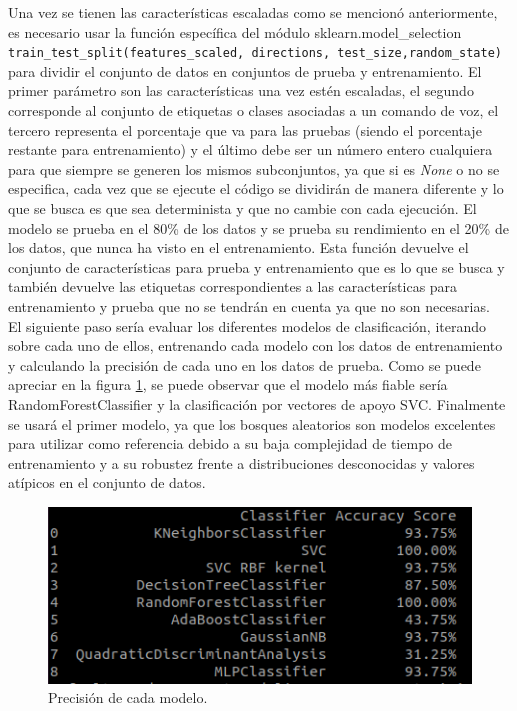 Una vez se tienen las características escaladas como se mencionó anteriormente, es necesario usar la función específica del módulo sklearn.model\_selection \verb|train_test_split(features_scaled, directions, test_size,random_state)| para dividir el conjunto de datos en conjuntos de prueba y entrenamiento. El primer parámetro son las características una vez estén escaladas, el segundo corresponde al conjunto de etiquetas o clases asociadas a un comando de voz, el tercero representa el porcentaje que va para las pruebas (siendo el porcentaje restante para entrenamiento) y el último debe ser un número entero cualquiera para que siempre se generen los mismos subconjuntos, ya que si es \textit{None} o no se especifica, cada vez que se ejecute el código se dividirán de manera diferente y lo que se busca es que sea determinista y que no cambie con cada ejecución. El modelo se prueba en el 80\% de los datos y se prueba su rendimiento en el 20\% de los datos, que nunca ha visto en el entrenamiento. Esta función devuelve el conjunto de características para prueba y entrenamiento que es lo que se busca y también devuelve las etiquetas correspondientes a las características para entrenamiento y prueba que no se tendrán en cuenta ya que no son necesarias.\\

El siguiente paso sería evaluar los diferentes modelos de clasificación, iterando sobre cada uno de ellos, entrenando cada modelo con los datos de entrenamiento y calculando la precisión de cada uno en los datos de prueba. Como se puede apreciar en la figura \ref{fig:modelos}, se puede observar que el modelo más fiable sería RandomForestClassifier y la clasificación por vectores de apoyo SVC. Finalmente se usará el primer modelo, ya que los bosques aleatorios son modelos excelentes para utilizar como referencia debido a su baja complejidad de tiempo de entrenamiento y a su robustez frente a distribuciones desconocidas y valores atípicos en el conjunto de datos.

\begin{figure}[H]
  \centering
  \includegraphics[scale=0.6]{figs/modelos} %
  \caption{ Precisión de cada modelo.}
  \label{fig:modelos}
\end{figure} 

